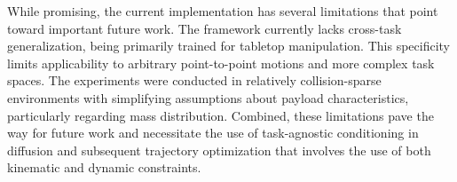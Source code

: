 While promising, the current implementation has several limitations that point toward important future work. The framework currently lacks cross-task generalization, being primarily trained for tabletop manipulation. This specificity limits applicability to arbitrary point-to-point motions and more complex task spaces.
The experiments were conducted in relatively collision-sparse environments with simplifying assumptions about payload characteristics, particularly regarding mass distribution.
Combined, these limitations pave the way for future work and necessitate the use of task-agnostic conditioning in diffusion and subsequent trajectory optimization that involves the use of both kinematic and dynamic constraints.







